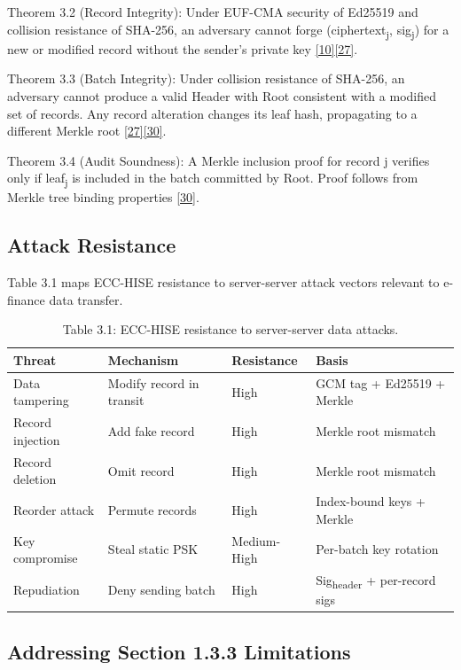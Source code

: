 \indent Theorem 3.2 (Record Integrity): Under EUF-CMA security of Ed25519 and collision resistance of SHA-256, an adversary cannot forge (ciphertext\textsubscript{j}, sig\textsubscript{j}) for a new or modified record without the sender's private key \hyperref[ref:10]{[10]}\hyperref[ref:27]{[27]}.

\indent Theorem 3.3 (Batch Integrity): Under collision resistance of SHA-256, an adversary cannot produce a valid Header with Root consistent with a modified set of records. Any record alteration changes its leaf hash, propagating to a different Merkle root \hyperref[ref:27]{[27]}\hyperref[ref:30]{[30]}.

\indent Theorem 3.4 (Audit Soundness): A Merkle inclusion proof for record j verifies only if leaf\textsubscript{j} is included in the batch committed by Root. Proof follows from Merkle tree binding properties \hyperref[ref:30]{[30]}.

\subsection{Attack Resistance}

\indent Table 3.1 maps ECC-HISE resistance to server-server attack vectors relevant to e-finance data transfer.

\begin{table}[htbp]
\centering
\begin{tabular}{llll}
\toprule
Threat & Mechanism & Resistance & Basis \\
\midrule
Data tampering & Modify record in transit & High & GCM tag + Ed25519 + Merkle \\
Record injection & Add fake record & High & Merkle root mismatch \\
Record deletion & Omit record & High & Merkle root mismatch \\
Reorder attack & Permute records & High & Index-bound keys + Merkle \\
Key compromise & Steal static PSK & Medium-High & Per-batch key rotation \\
Repudiation & Deny sending batch & High & Sig\textsubscript{header} + per-record sigs \\
\bottomrule
\end{tabular}
\caption{Table 3.1: ECC-HISE resistance to server-server data attacks.}\label{tbl:3.1}
\end{table}
\subsection{Addressing Section 1.3.3 Limitations}

